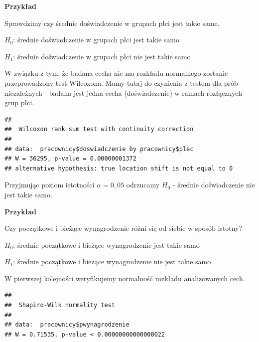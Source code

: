 \documentclass[]{book}
\newenvironment{Shaded}{\begin{snugshade}}{\end{snugshade}}
\newcommand{\KeywordTok}[1]{\textcolor[rgb]{0.13,0.29,0.53}{\textbf{#1}}}
\newcommand{\NormalTok}[1]{#1}
\newcommand{\OperatorTok}[1]{\textcolor[rgb]{0.81,0.36,0.00}{\textbf{#1}}}
\newcommand{\StringTok}[1]{\textcolor[rgb]{0.31,0.60,0.02}{#1}}
\begin{document}
\textbf{Przykład}

Sprawdzimy czy średnie doświadczenie w grupach płci jest takie same.

\(H_0\): średnie doświadczenie w grupach płci jest takie samo

\(H_1\): średnie doświadczenie w grupach płci nie jest takie samo

W związku z tym, że badana cecha nie ma rozkładu normalnego zostanie przeprowadzony test Wilcoxona. Mamy tutaj do czynienia z testem dla prób niezależnych - badana jest jedna cecha (doświadczenie) w ramach rozłącznych grup płci.

\begin{Shaded}
\end{Shaded}

\begin{verbatim}
## 
##  Wilcoxon rank sum test with continuity correction
## 
## data:  pracownicy$doswiadczenie by pracownicy$plec
## W = 36295, p-value = 0.00000001372
## alternative hypothesis: true location shift is not equal to 0
\end{verbatim}

Przyjmując poziom istotności \(\alpha = 0,05\) odrzucamy \(H_0\) - średnie doświadczenie nie jest takie samo.

\textbf{Przykład}

Czy początkowe i bieżące wynagrodzenie różni się od siebie w sposób istotny?

\(H_0\): średnie początkowe i bieżące wynagrodzenie jest takie samo

\(H_1\): średnie początkowe i bieżące wynagrodzenie nie jest takie samo

W pierwszej kolejności weryfikujemy normalność rozkładu analizowanych cech.

\begin{Shaded}
\end{Shaded}

\begin{verbatim}
## 
##  Shapiro-Wilk normality test
## 
## data:  pracownicy$pwynagrodzenie
## W = 0.71535, p-value < 0.00000000000000022
\end{verbatim}
\end{document}
